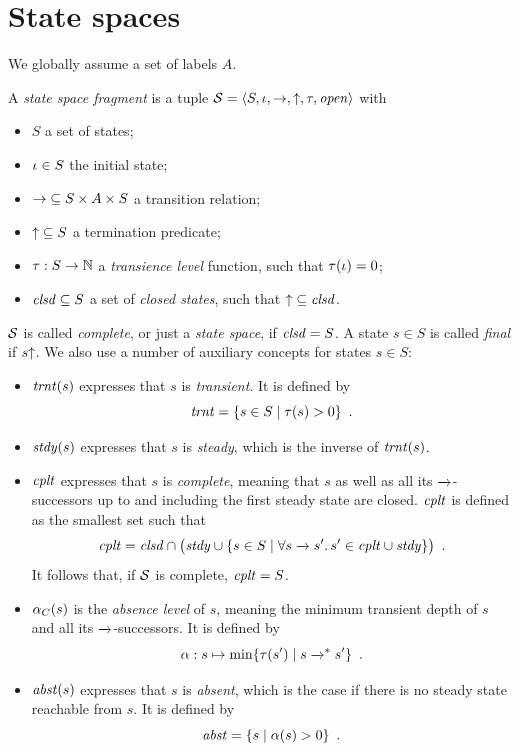 \documentclass{article}
\begin{document}
\section*{State spaces}

\medskip\noindent
We globally assume a set of labels $A$.

\medskip\noindent 
A \emph{state space fragment} is a tuple $\mathcal{S}=\langle{S,\ensuremath{\iota},{\rightarrow},{{\uparrow}},\ensuremath{\tau},\ensuremath{\mathit{open}}}\rangle$ with
\begin{itemize}
\item $S$ a set of states;
\item $\iota\in S$ the initial state;
\item ${\rightarrow}\subseteq S\times A\times S$ a transition relation;
\item ${{\uparrow}}\subseteq S$ a termination predicate;
\item ${\tau}:S\to \mathbb{N}$ a \emph{transience level} function, such that $\tau(\iota)=0$;
\item $\mathit{clsd}\subseteq S$ a set of \emph{closed states}, such that ${\uparrow}\subseteq \mathit{clsd}$.
\end{itemize}
%
$\mathcal{S}$ is called \emph{complete}, or just a \emph{state space}, if $\mathit{clsd}=S$. A state $s\in S$ is called \emph{final} if $s{\uparrow}$. We also use a number of auxiliary concepts for states $s\in S$:

\begin{itemize}
\item $\mathit{trnt}(s)$ expresses that $s$ is \emph{transient}. It is defined by
%
\[ \Transient = \gensetof{s\in S}{\TLevel(s)>0} \enspace. \]

\item $\mathit{stdy}(s)$ expresses that $s$ is \emph{steady}, which is the inverse of $\mathit{trnt}(s)$.

\item $\mathit{cplt}$ expresses that $s$ is \emph{complete}, meaning that $s$ as well as all its $\trans{}$-successors up to and including the first steady state are closed. $\mathit{cplt}$ is defined as the smallest set such that
%
\[ \Complete = \Closed\cap \bigl(\Steady \cup \gensetof{s\in S}{\forall s\trans{} s'.\, s'\in \Complete\cup \Steady}\bigr) \enspace.
\]
It follows that, if $\mathcal{S}$ is complete, $\mathit{cplt}=S$.

\item $\alpha_C(s)$ is the \emph{absence level} of $s$, meaning the minimum transient depth of $s$ and all its $\trans{}$-successors. It is defined by
%
\[ \ALevel: s\mapsto \min\gensetof{\TLevel(s')}{s\trans{}^* s'} \enspace. \]

\item $\mathit{abst}(s)$ expresses that $s$ is \emph{absent}, which is the case if there is no steady state reachable from $s$. It is defined by
%
\[ \Absent= \gensetof{s}{\ALevel(s)>0} \enspace. \]
\end{itemize}
\end{document}
